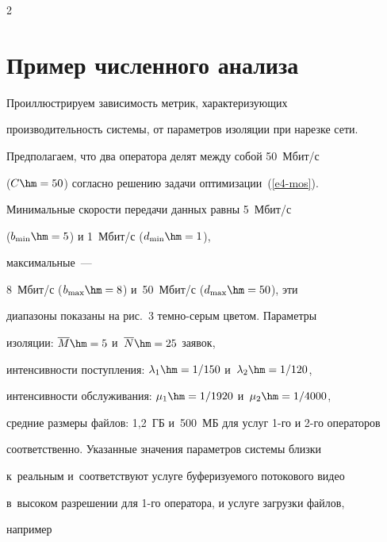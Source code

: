 \begin{multicols}{2}
  \section{Пример численного анализа}  %


  


  Проиллюстрируем зависимость метрик, характеризующих 


производительность системы, от пара\-метров изоляции при нарезке сети. 


Предполагаем, что два оператора делят между собой 50~Мбит/с 


($C\hm=50$) согласно решению задачи оптимизации~(\ref{e4-mos}). 


Минимальные скорости передачи данных равны 5~Мбит/с 


($b_{\min}\hm=5$) и 1~Мбит/с ($d_{\min}\hm=1$),\linebreak


\vspace*{-12pt}


\pagebreak





\noindent


 максимальные~--- 


8~Мбит/с ($b_{\max}\hm=8$) и~50~Мбит/с ($d_{\max}\hm=50$), эти 


диапазоны показаны на рис.~3 тем\-но-се\-рым цветом. Параметры 


изоляции: $\overline{M}\hm=5$ и~$\overline{N}\hm=25$ заявок, 


интенсивности поступления: $\lambda_1\hm=1/150$ и~$\lambda_2\hm=1/120$, 


интенсивности обслуживания: $\mu_1\hm= 1/1920$ и~$\mu_2\hm=1/4000$, 


средние размеры файлов: 1,2~ГБ и~500~МБ для услуг 1-го и 2-го операторов 


соответственно. Указанные значения параметров сис\-те\-мы близ\-ки 


к~реальным и~соответствуют услуге буферизуемого потокового видео 


в~высоком разрешении для 1-го оператора, и услуге загрузки файлов, 


например









\end{multicols}
